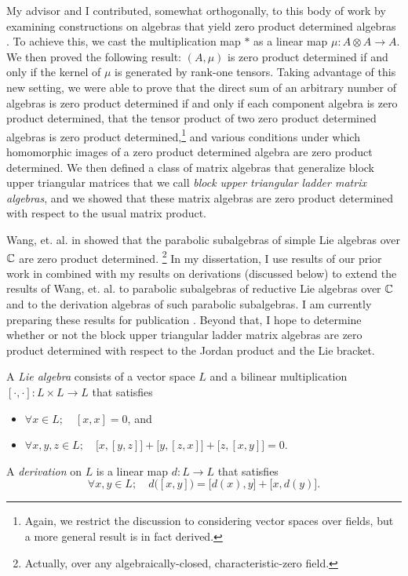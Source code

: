 \documentclass[11pt]{article}
\begin{document}
My advisor and I contributed, somewhat orthogonally, to this body of
work by examining constructions on algebras that yield zero product
determined algebras \cite{article:brice2015zero}. To achieve this, we cast the
multiplication map $\ast$ as a linear map $\mu : A \otimes A \to A$.
We then proved the following result:
$(A, \mu)$ is zero product determined if and only if the kernel of $\mu$
is generated by rank-one tensors.
Taking advantage of this new setting, we were able to prove that the
direct sum of an arbitrary number of algebras is zero product determined
if and only if each component algebra is zero product determined, that
the tensor product of two zero product determined algebras is zero
product determined,\footnote{Again, we restrict the discussion to
considering vector spaces over fields, but a more general result is in
fact derived.} and various conditions under which homomorphic images of
a zero product determined algebra are zero product determined.
We then defined a class of matrix algebras that generalize block upper
triangular matrices that we call \emph{block upper triangular ladder
matrix algebras}, and we showed that these matrix algebras are zero
product determined with respect to the usual matrix product.

Wang, et. al. in \cite{wang2011class} showed that the parabolic
subalgebras of simple Lie algebras over $\mathbb{C}$ are zero product
determined.
\footnote{Actually, over any algebraically-closed, characteristic-zero
field.}
In my dissertation, I use results of our prior work in
\cite{article:brice2015zero} combined with my results on derivations
(discussed below) to extend the results of Wang, et. al. to parabolic
subalgebras of reductive Lie algebras over $\mathbb{C}$ and to the derivation
algebras of such parabolic subalgebras. I am currently preparing these
results for publication \cite{inprep:brice0000note}.
Beyond that, I hope to determine whether or not the block upper
triangular ladder matrix algebras are zero product determined with
respect to the Jordan product and the Lie bracket.


A \emph{Lie algebra} consists of a vector space $L$ and a bilinear
multiplication $[\cdot,\cdot]: L \times L \to L$ that satisfies
\begin{itemize}
	\item[] $\forall x \in L;\quad [x,x] = 0$, and
	\item[] $\forall x,y,z \in L;\quad
    \big[x,[y,z]\big]+\big[y,[z,x]\big]+\big[z,[x,y]\big]=0$.
\end{itemize}
A \emph{derivation} on $L$ is a linear map $d: L \to L$ that satisfies
\[
  \forall x,y \in L;\quad
  d\big([x,y]\big) = \big[d(x),y\big] + \big[x,d(y)\big]
  \text{.}
\]
\end{document}
